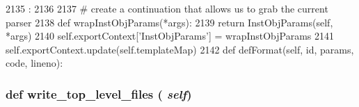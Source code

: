 \begin{DoxyCode}
2135                                  :
2136 
2137         # create a continuation that allows us to grab the current parser
2138         def wrapInstObjParams(*args):
2139             return InstObjParams(self, *args)
2140         self.exportContext['InstObjParams'] = wrapInstObjParams
2141         self.exportContext.update(self.templateMap)
2142 
    def defFormat(self, id, params, code, lineno):
\end{DoxyCode}
\hypertarget{classisa__parser_1_1ISAParser_ad4faa0dfb91cd69dfc8f3a19f3fafd82}{
\subsubsection[{write\_\-top\_\-level\_\-files}]{\setlength{\rightskip}{0pt plus 5cm}def write\_\-top\_\-level\_\-files ( {\em self})}}
\label{classisa__parser_1_1ISAParser_ad4faa0dfb91cd69dfc8f3a19f3fafd82}



